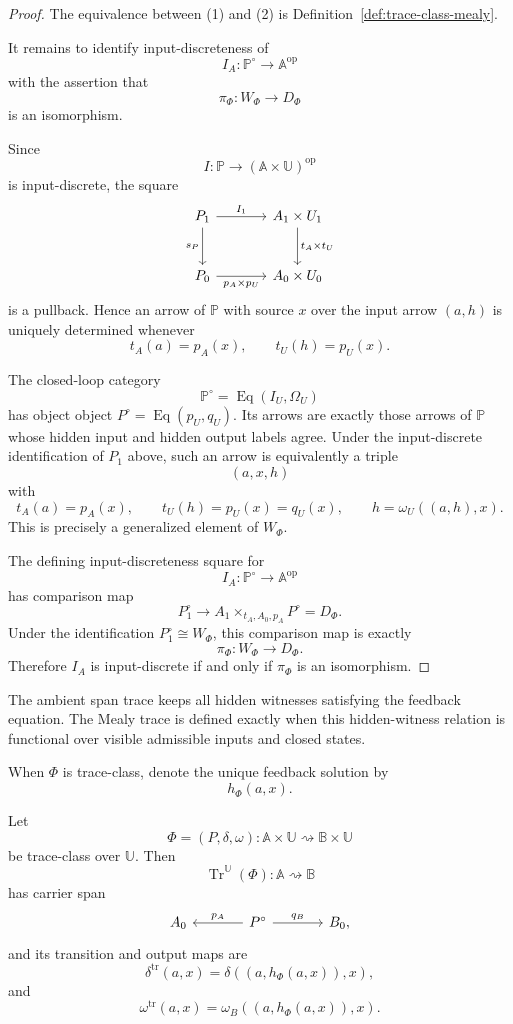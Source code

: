 \begin{proof}
The equivalence between (1) and (2) is
Definition~\ref{def:trace-class-mealy}.

It remains to identify input-discreteness of
\[
I_A:\mathbb P^\circ\to\mathbb A^{\mathrm{op}}
\]
with the assertion that
\[
\pi_\Phi:W_\Phi\to D_\Phi
\]
is an isomorphism.

Since
\[
I:\mathbb P\to(\mathbb A\times\mathbb U)^{\mathrm{op}}
\]
is input-discrete, the square
\[
\begin{tikzcd}[column sep=large,row sep=large]
P_1
  \arrow[r, "I_1"]
  \arrow[d, "s_P"']
&
A_1\times U_1
  \arrow[d, "t_A\times t_U"]
\\
P_0
  \arrow[r, "p_A\times p_U"']
&
A_0\times U_0
\end{tikzcd}
\]
is a pullback.  Hence an arrow of \(\mathbb P\) with source \(x\) over the
input arrow \((a,h)\) is uniquely determined whenever
\[
t_A(a)=p_A(x),
\qquad
t_U(h)=p_U(x).
\]

The closed-loop category
\[
\mathbb P^\circ=\operatorname{Eq}(I_U,\Omega_U)
\]
has object object \(P^\circ=\operatorname{Eq}(p_U,q_U)\).  Its arrows are
exactly those arrows of \(\mathbb P\) whose hidden input and hidden output
labels agree.  Under the input-discrete identification of \(P_1\) above, such
an arrow is equivalently a triple
\[
(a,x,h)
\]
with
\[
t_A(a)=p_A(x),
\qquad
t_U(h)=p_U(x)=q_U(x),
\qquad
h=\omega_U((a,h),x).
\]
This is precisely a generalized element of \(W_\Phi\).

The defining input-discreteness square for
\[
I_A:\mathbb P^\circ\to\mathbb A^{\mathrm{op}}
\]
has comparison map
\[
P^\circ_1
\longrightarrow
A_1\times_{t_A,A_0,p_A}P^\circ
=
D_\Phi.
\]
Under the identification \(P^\circ_1\cong W_\Phi\), this comparison map is
exactly
\[
\pi_\Phi:W_\Phi\to D_\Phi.
\]
Therefore \(I_A\) is input-discrete if and only if \(\pi_\Phi\) is an
isomorphism.
\end{proof}

The ambient span trace keeps all hidden witnesses satisfying the feedback
equation.  The Mealy trace is defined exactly when this hidden-witness
relation is functional over visible admissible inputs and closed states.

When \(\Phi\) is trace-class, denote the unique feedback solution by
\[
h_\Phi(a,x).
\]

\begin{proposition}
\label{prop:component-formula-partial-trace}
Let
\[
\Phi=(P,\delta,\omega):
\mathbb A\times\mathbb U
\rightsquigarrow
\mathbb B\times\mathbb U
\]
be trace-class over \(\mathbb U\).  Then
\[
\operatorname{Tr}^{\mathbb U}(\Phi):
\mathbb A\rightsquigarrow\mathbb B
\]
has carrier span
\[
\begin{tikzcd}[column sep=large]
A_0
&
P^\circ
  \arrow[l, "p_A"']
  \arrow[r, "q_B"]
&
B_0,
\end{tikzcd}
\]
and its transition and output maps are
\[
\delta^{\operatorname{tr}}(a,x)
=
\delta((a,h_\Phi(a,x)),x),
\]
and
\[
\omega^{\operatorname{tr}}(a,x)
=
\omega_B((a,h_\Phi(a,x)),x).
\]
\end{proposition}

